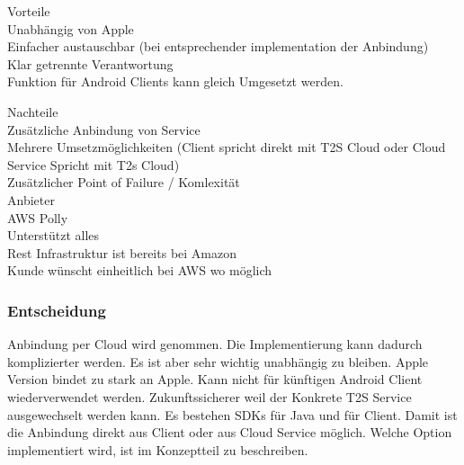 Vorteile \\

Unabhängig von Apple \\
Einfacher austauschbar (bei entsprechender implementation der Anbindung) \\
Klar getrennte Verantwortung \\
Funktion für Android Clients kann gleich Umgesetzt werden.

Nachteile \\
Zusätzliche Anbindung von Service \\
Mehrere Umsetzmöglichkeiten (Client spricht direkt mit T2S Cloud oder Cloud Service Spricht mit T2s Cloud) \\
Zusätzlicher Point of Failure / Komlexität \\



Anbieter \\

AWS Polly \cite{aws_polly} \\
Unterstützt alles \\
Rest Infrastruktur ist bereits bei Amazon \\
Kunde wünscht einheitlich bei AWS wo möglich \\


\subsubsection{Entscheidung}

Anbindung per Cloud wird genommen.
Die Implementierung kann dadurch komplizierter werden.
Es ist aber sehr wichtig unabhängig zu bleiben.
Apple Version bindet zu stark an Apple.
Kann nicht für künftigen Android Client wiederverwendet werden.
Zukunftssicherer weil der Konkrete T2S Service ausgewechselt werden kann.
Es bestehen SDKs für Java und für Client.
Damit ist die Anbindung direkt aus Client oder aus Cloud Service möglich.
Welche Option implementiert wird, ist im Konzeptteil zu beschreiben.


\clearpage
